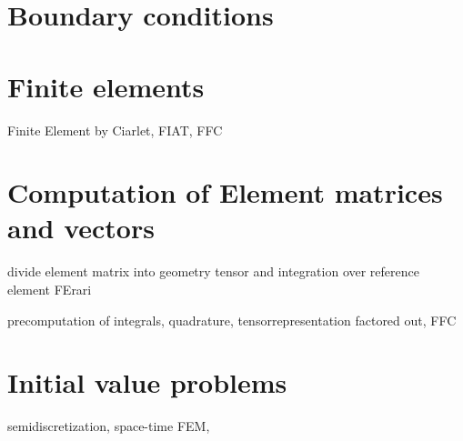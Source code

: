 \section{Boundary conditions}

\section{Finite elements}

Finite Element by Ciarlet, FIAT, FFC  

\section{Computation of Element matrices and vectors} 

divide element matrix into geometry tensor and integration 
over reference element FErari

precomputation of integrals, quadrature, tensorrepresentation factored out, FFC 

\section{Initial value problems}

semidiscretization, space-time FEM, 


